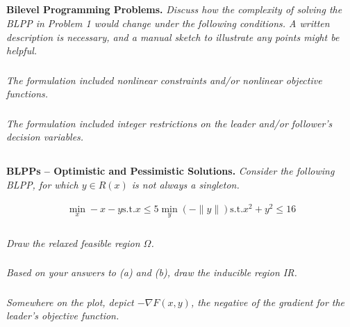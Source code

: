 \documentclass[12pt]{amsart}
\begin{document}
\subsection{}
\textbf{Bilevel Programming Problems.} 
\textit{Discuss how the complexity of solving the BLPP in Problem 1 would change under the following conditions. A written description is necessary, and a manual sketch to illustrate any points might be helpful.}

% 
% 

\subsubsection{}
\textit{The formulation included nonlinear constraints and/or nonlinear objective functions.}

\subsubsection{}
\textit{The formulation included integer restrictions on the leader and/or follower’s decision variables.}



\subsection{}
\textbf{BLPPs – Optimistic and Pessimistic Solutions.} 
\textit{Consider the following BLPP, for which $y\in R(x)$ is not always a singleton.}

\begin{align*}
	\min_x	-x-y
	\text{s.t.}	x \leq 5
	\min_y	(-\|y\|)
	\text{s.t.}	x^2 + y^2 \leq 16
\end{align*}

% 
% 

\subsubsection{}
\textit{Draw the relaxed feasible region $\Omega$.}

\subsubsection{}
\textit{Based on your answers to (a) and (b), draw the inducible region IR.}

\subsubsection{}
\textit{Somewhere on the plot, depict $-\nabla F(x,y)$, the negative of the gradient for the leader’s objective function.}
\end{document}
